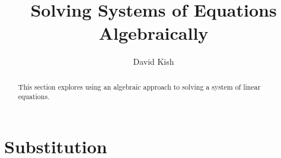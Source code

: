\documentclass[nooutcomes]{ximera}
\author{David Kish}
\title{Solving Systems of Equations Algebraically}
\begin{document}
\begin{abstract}
This section explores using an algebraic approach to solving a system of linear equations.
\end{abstract}
\maketitle




\section{Substitution}
\end{document}
